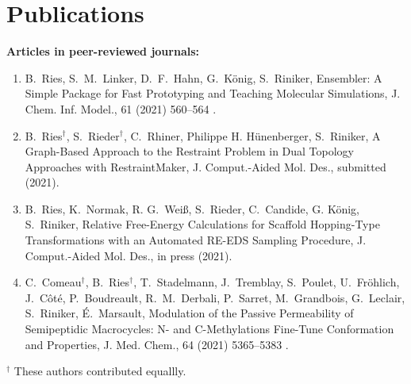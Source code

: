 \chapter{Publications}
\noindent \textbf{Articles in peer-reviewed journals:}
\begin{enumerate}
\item B.\ Ries, S.\ M.\ Linker, D.\ F.\ Hahn, G.\ K\"onig, S.\ Riniker, Ensembler: A Simple Package for Fast Prototyping and Teaching Molecular Simulations, {J. Chem. Inf. Model.}, {61} (2021) 560--564 .

\item B.\ Ries$^\dag$, S.\ Rieder$^\dag$, C.\ Rhiner, Philippe H. H\"unenberger, S.\ Riniker, A Graph-Based Approach to the Restraint Problem in Dual Topology Approaches with RestraintMaker, {J. Comput.-Aided Mol. Des.}, submitted (2021).

\item B.\ Ries, K.\ Normak, R. G.\ Wei\ss, S.\ Rieder, C.\ Candide, G. K\"onig, S.\ Riniker, Relative Free-Energy Calculations for Scaffold Hopping-Type Transformations with an Automated RE-EDS Sampling Procedure, {J. Comput.-Aided Mol. Des.}, in press (2021).

\item C.\ Comeau$^\dag$, B.\ Ries$^\dag$, T.\ Stadelmann, J.\ Tremblay, S.\ Poulet, U.\ Fröhlich, J.\ Côté, P.\ Boudreault, R.\ M.\ Derbali, P.\ Sarret, M.\ Grandbois, G.\ Leclair, S.\ Riniker, \'E.\ Marsault, Modulation of the Passive Permeability of Semipeptidic Macrocycles: N- and C-Methylations Fine-Tune Conformation and Properties, {J. Med. Chem.}, {64} (2021) 5365--5383 .
\end{enumerate}
\noindent $^\dag$ These authors contributed equallly. \\

